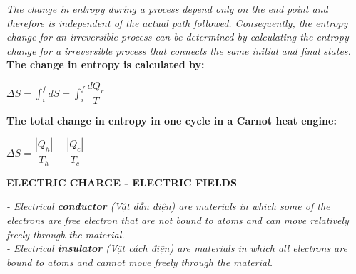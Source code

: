\documentclass[10pt]{article}
\begin{document}
\begin{enumerate}
	 \textit{The change in entropy during a process depend only on the end point and therefore is independent of the actual path followed. Consequently, the entropy change for an irreversible process can be determined by calculating the entropy change for a irreversible process that connects the same initial and final states.}\\
	 \textbf{The change in entropy is calculated by:}
	 \begin{mybox}
	 \begin{center}
	 $\Delta S = \displaystyle \int_i^f dS = \int_i^f \dfrac{dQ_r}{T}$
	 \end{center}
	 \end{mybox}
	 \textbf{The total change in entropy in one cycle in a Carnot heat engine:}
	 \begin{mybox}
	 \begin{center}
	 $\Delta S = \dfrac{|Q_h|}{T_h} - \dfrac{|Q_c|}{T_c}$
	 \end{center}
	\end{mybox}
\end{enumerate}
\pagebreak
\begin{center}
\textbf{ELECTRIC CHARGE - ELECTRIC FIELDS }
\end{center}
\textit{ - Electrical \textbf{conductor} (Vật dẫn điện) are materials in which some of the electrons are free electron that are not bound to atoms and can move relatively freely through the material.}\\
\textit{ - Electrical \textbf{insulator} (Vật cách điện) are materials in which all electrons are bound to atoms and cannot move freely through the material.}
\end{document}
